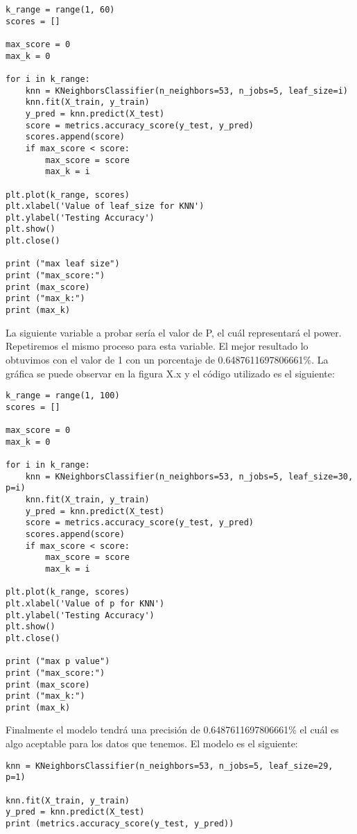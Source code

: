 \begin{lstlisting}
k_range = range(1, 60)
scores = []

max_score = 0
max_k = 0

for i in k_range:
    knn = KNeighborsClassifier(n_neighbors=53, n_jobs=5, leaf_size=i)
    knn.fit(X_train, y_train)
    y_pred = knn.predict(X_test)
    score = metrics.accuracy_score(y_test, y_pred)
    scores.append(score)
    if max_score < score:
        max_score = score
        max_k = i

plt.plot(k_range, scores)
plt.xlabel('Value of leaf_size for KNN')
plt.ylabel('Testing Accuracy')
plt.show()
plt.close()

print ("max leaf size")
print ("max_score:")
print (max_score)
print ("max_k:")
print (max_k)
\end{lstlisting}

La siguiente variable a probar sería el valor de P, el cuál representará el power.
Repetiremos el mismo proceso para esta variable. El mejor resultado lo obtuvimos con
el valor de 1 con un porcentaje de 0.6487611697806661\%. La gráfica se puede observar
en la figura X.x y el código utilizado es el siguiente:


\begin{lstlisting}
k_range = range(1, 100)
scores = []

max_score = 0
max_k = 0

for i in k_range:
    knn = KNeighborsClassifier(n_neighbors=53, n_jobs=5, leaf_size=30, p=i)
    knn.fit(X_train, y_train)
    y_pred = knn.predict(X_test)
    score = metrics.accuracy_score(y_test, y_pred)
    scores.append(score)
    if max_score < score:
        max_score = score
        max_k = i

plt.plot(k_range, scores)
plt.xlabel('Value of p for KNN')
plt.ylabel('Testing Accuracy')
plt.show()
plt.close()

print ("max p value")
print ("max_score:")
print (max_score)
print ("max_k:")
print (max_k)
\end{lstlisting}

Finalmente el modelo tendrá una precisión de 0.6487611697806661\% el cuál es algo
aceptable para los datos que tenemos. El modelo es el siguiente:

\begin{lstlisting}
knn = KNeighborsClassifier(n_neighbors=53, n_jobs=5, leaf_size=29, p=1)

knn.fit(X_train, y_train)
y_pred = knn.predict(X_test)
print (metrics.accuracy_score(y_test, y_pred))
\end{lstlisting}

